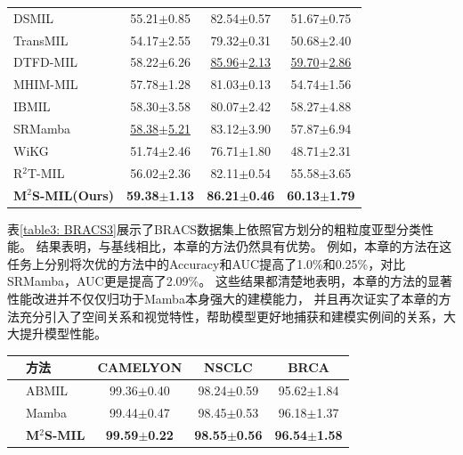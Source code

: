 {\begin{xltabular}{\textwidth}{XCCC}
  DSMIL~\cite{li2021dual}          & 55.21$\pm$0.85 & 82.54$\pm$0.57 & 51.67$\pm$0.75\\
  TransMIL~\cite{shao2021transmil} & 54.17$\pm$2.55 & 79.32$\pm$0.31 & 50.68$\pm$2.40  \\
  DTFD-MIL~\cite{zhang2022dtfd}    & 58.22$\pm$6.26 &\underline{85.96$\pm$2.13} &\underline{59.70$\pm$2.86} \\
  MHIM-MIL~\cite{tang2023multiple}    &57.78$\pm$1.28 & 81.03$\pm$0.13 &54.74$\pm$1.56 \\
  IBMIL~\cite{lin2023interventional}    & 58.30$\pm$3.58 & 80.07$\pm$2.42 & 58.27$\pm$4.88\\
  SRMamba ~\cite{yang2024mambamil}& \underline{58.38$\pm$5.21}&83.12$\pm$3.90 & 57.87$\pm$6.94 \\
  WiKG ~\cite{li2024dynamic}& 51.74$\pm$2.46 & 76.71$\pm$1.80 & 48.71$\pm$2.31 \\
  R$^2$T-MIL ~\cite{tang2024feature}& 56.02$\pm$2.36 &82.11$\pm$0.54 & 55.58$\pm$3.65  \\
  \textbf{M$^2$S-MIL(Ours)} &\textbf{59.38$\pm$1.13} &\textbf{86.21$\pm$0.46} & \textbf{60.13$\pm$1.79}\\

\end{xltabular}}




表\ref{table3: BRACS3}展示了BRACS数据集上依照官方划分的粗粒度亚型分类性能。
结果表明，与基线相比，本章的方法仍然具有优势。
例如，本章的方法在这任务上分别将次优的方法中的Accuracy和AUC提高了1.0\%和0.25\%，对比SRMamba，AUC更是提高了2.09\%。
这些结果都清楚地表明，本章的方法的显著性能改进并不仅仅归功于Mamba本身强大的建模能力，
并且再次证实了本章的方法充分引入了空间关系和视觉特性，帮助模型更好地捕获和建模实例间的关系，大大提升模型性能。

\begin{table}[h!]
  \large    %
  \centering
  \begin{tabularx}{\textwidth}{clCCC}
    \toprule
    &方法  & CAMELYON& NSCLC&BRCA\\ \midrule
    &
    ABMIL~\cite{ilse2018attention} &  99.36$\pm$0.40 & 98.24$\pm$0.59 & 95.62$\pm$1.84   \\
    &Mamba ~\cite{gu2023mamba} & 99.44$\pm$0.47 & 98.45$\pm$0.53 & 96.18$\pm$1.37  \\
    &\textbf{M$^2$S-MIL}  &  \textbf{99.59$\pm$0.22} & \textbf{98.55$\pm$0.56} & \textbf{96.54$\pm$1.58}  \\    \bottomrule
  \end{tabularx}
  \label{table3: UNI}
\end{table}

